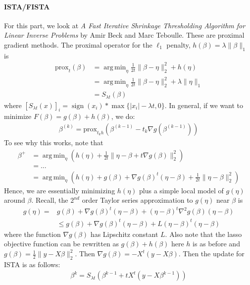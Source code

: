 \documentclass[12pt, leqno]{article}
\providecommand{\abs}[1]{\lvert#1\rvert} %
\providecommand{\norm}[1]{\lVert#1\rVert} %
\DeclareMathOperator*{\argmin}{arg\,min}
\DeclareMathOperator*{\sign}{sign}
\begin{document}
\pagebreak

\paragraph{ISTA/FISTA} For this part, we look at {\it A Fast
  Iterative Shrinkage Thresholding Algorithm
for Linear Inverse Problems} by Amir Beck and Marc Teboulle. These are
proximal gradient methods. The proximal operator for the $\ell_1$
penalty, $h(\beta) = \lambda \norm{\beta}_1$ is 
\begin{align*}
\text{prox}_t(\beta) &= \argmin_{\eta} \frac{1}{2t} \norm{\beta-\eta}_2^2 + h(\eta)
   \\
&= \argmin_{\eta} \frac{1}{2t} \norm{\beta-\eta}_2^2 +
  \lambda \norm{\eta}_1 \\
 &= S_{\lambda t} (\beta)
\end{align*}
where $[S_{\lambda t} (x)]_i = \sign (x_i)* \max\{ \abs{x_i} - \lambda
t, 0 \}$. In general, if we want to minimize $F(\beta) = g(\beta) + h(\beta)$, we do:
\begin{align*}
\beta^{(k)} = \text{prox}_{t_kh}(\beta^{(k-1)}-t_k \nabla g(\beta^{(k-1)}))
\end{align*}
To see why this works, note that
\begin{align*}
\beta^+ &= \argmin_{\eta} (h(\eta) + \frac{1}{2t} \norm{\eta - \beta + t \nabla g(\beta)}_2^2) \\
&= ...\\
&= \argmin_{\eta} (h(\eta) + g(\beta) + \nabla g(\beta)^t(\eta - \beta) + \frac{1}{2t} \norm{\eta - \beta}_2^2) 
\end{align*}
Hence, we are essentially minimizing $h(\eta)$ plus a simple local model of $g(\eta)$ around $\beta$. Recall, the $2^{nd}$ order Taylor series approximation to $g(\eta)$ near $\beta$ is 
\begin{align*}
g(\eta) =& g(\beta) + \nabla g(\beta)^t (\eta - \beta) + (\eta-\beta)^t \nabla^2 g(\beta) (\eta -\beta) \\
&\leq  g(\beta) + \nabla g(\beta)^t (\eta - \beta) + L (\eta-\beta)^t (\eta -\beta)
\end{align*}
where the function $\nabla g(\beta)$ has Lipschitz constant $L$.
Also note that the lasso objective function can be rewritten as
$g(\beta) + h(\beta)$ here $h$ is as before and $g(\beta) =
\frac{1}{2}\norm{y- X \beta}_2^2$. Then  $\nabla g(\beta) = -X^t (y -
X \beta)$. Then the update for ISTA is as follows:
\begin{align*}
\beta^{k} = S_{\lambda t} (\beta^{k-1} + t X^t (y -
X \beta^{k-1})) 
\end{align*}
\end{document}
